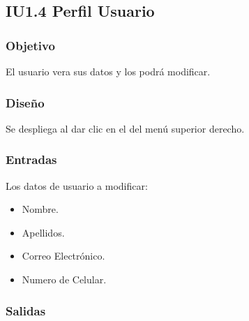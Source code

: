 \newpage
\subsection{IU1.4 Perfil Usuario}

\subsubsection{Objetivo}
	El usuario vera sus datos y los podrá modificar.  

\subsubsection{Diseño}
	Se despliega al dar clic en el  del menú superior derecho.


\subsubsection{Entradas}
Los datos de usuario a modificar:
\begin{itemize}	
	\item Nombre.
	\item Apellidos.
	\item Correo Electrónico.
	\item Numero de Celular.
\end{itemize}

\subsubsection{Salidas}
\begin{Citemize}
	\item {}
	\item {}
	\item {}
\end{Citemize} 